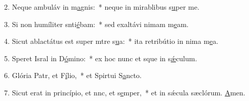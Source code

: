 2. Neque ambuláv in m\uline{a}gnis:~* neque in mirablibus s\uline{u}per me.\par 
3. Si non humíliter snti\uline{é}bam:~* sed exaltávi nimam m\uline{e}am.\par 
4. Sicut ablactátus est super mtre s\uline{u}a:~* ita retribútio in nima m\uline{e}a.\par 
5. Speret Isral in D\uline{ó}mino:~* ex hoc nunc et sque in s\uline{ǽ}culum.\par 
6. Glória Patr, et F\uline{í}lio,~* et Spirtui S\uline{a}ncto.\par 
7. Sicut erat in princípio, et nnc, et s\uline{e}mper,~* et in sǽcula sæclórum. \uline{A}men.\par 
